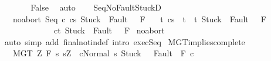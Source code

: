\begin{isabellebody}
\isanewline
\ \ \ \ \isamarkupfalse%
\ \isamarkupfalse%
\ False\ \isamarkupfalse%
\ auto\isanewline
\ \ \isamarkupfalse%
\isanewline
{}\isamarkupfalse%
%
\endisatagproof
{\isafoldproof}%
%
\isadelimproof
\isanewline
%
\endisadelimproof
\isanewline
{}\isamarkupfalse%
\ Seq{\isacharunderscore}NoFaultStuckD{}{\isacharcolon}\ \isanewline
\ \ \ noabort{\isacharcolon}\ {\isachardoublequoteopen}{\isasymGamma}{\isasymturnstile}{\isasymlangle}Seq\ c{}\ c{}{\isacharcomma}s{\isasymrangle}\ {\isasymRightarrow}{\isasymnotin}{\isacharparenleft}{\isacharbraceleft}Stuck{\isacharbraceright}\ {\isasymunion}\ Fault\ {\isacharbackquote}\ \ F{\isacharparenright}{\isachardoublequoteclose}\isanewline
\ \ \ {\isachardoublequoteopen}{\isasymforall}t{\isachardot}\ {\isasymGamma}{\isasymturnstile}{\isasymlangle}c{}{\isacharcomma}s{\isasymrangle}\ {\isasymRightarrow}\ t\ {\isasymlongrightarrow}\ t{\isasymnotin}\ {\isacharparenleft}{\isacharbraceleft}Stuck{\isacharbraceright}\ {\isasymunion}\ Fault\ {\isacharbackquote}\ \ F{\isacharparenright}\ {\isasymlongrightarrow}\ \isanewline
\ \ \ \ \ \ \ \ \ \ \ \ \ {\isasymGamma}{\isasymturnstile}{\isasymlangle}c{}{\isacharcomma}t{\isasymrangle}\ {\isasymRightarrow}{\isasymnotin}{\isacharparenleft}{\isacharbraceleft}Stuck{\isacharbraceright}\ {\isasymunion}\ Fault\ {\isacharbackquote}\ \ F{\isacharparenright}{\isachardoublequoteclose}\isanewline
%
\isadelimproof
%
\endisadelimproof
%
\isatagproof
{}\isamarkupfalse%
\ noabort\isanewline
{}\isamarkupfalse%
\ {\isacharparenleft}auto\ simp\ add{\isacharcolon}\ final{\isacharunderscore}notin{\isacharunderscore}def\ intro{\isacharcolon}\ exec{\isacharunderscore}Seq{\isacharprime}{\isacharparenright}%
\endisatagproof
{\isafoldproof}%
%
\isadelimproof
\isanewline
%
\endisadelimproof
\isanewline
\isanewline
{}\isamarkupfalse%
\ MGT{\isacharunderscore}implies{\isacharunderscore}complete{\isacharcolon}\isanewline
\ \ \ MGT{\isacharcolon}\ {\isachardoublequoteopen}{\isasymforall}Z{\isachardot}\ {\isasymGamma}{\isacharcomma}{\isacharbraceleft}{\isacharbraceright}{\isasymturnstile}\isactrlbsub {\isacharslash}F\isactrlesub \ {\isacharbraceleft}s{\isachardot}\ s{\isacharequal}Z\ {\isasymand}\ {\isasymGamma}{\isasymturnstile}{\isasymlangle}c{\isacharcomma}Normal\ s{\isasymrangle}\ {\isasymRightarrow}{\isasymnotin}{\isacharparenleft}{\isacharbraceleft}Stuck{\isacharbraceright}\ {\isasymunion}\ \ Fault\ {\isacharbackquote}\ {\isacharparenleft}{\isacharminus}F{\isacharparenright}{\isacharparenright}{\isacharbraceright}\ c\ \isanewline

\end{isabellebody}
